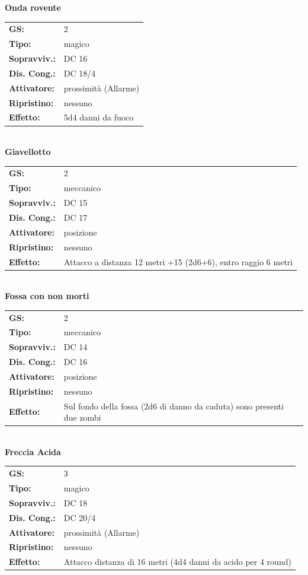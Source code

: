 \begin{multicols}{2}
\textbf{Onda rovente}

\begin{tabularx}{0.48\textwidth}{lX}
	\textbf{GS:} & 2 \\
	\textbf{Tipo:} & magico \\
	\textbf{Sopravviv.:} & DC 16 \\
	\textbf{Dis. Cong.:} & DC 18/4 \\
	\textbf{Attivatore:} & prossimità (Allarme) \\
	\textbf{Ripristino:} & nessuno \\
	\textbf{Effetto:} & 5d4 danni da fuoco
\end{tabularx}\\

\textbf{Giavellotto}

\begin{tabularx}{0.48\textwidth}{lX}
	\textbf{GS:} & 2 \\
	\textbf{Tipo:} & meccanico \\
	\textbf{Sopravviv.:} & DC 15 \\
	\textbf{Dis. Cong.:} & DC 17 \\
	\textbf{Attivatore:} & posizione \\
	\textbf{Ripristino:} & nessuno \\
	\textbf{Effetto:} & Attacco a distanza 12 metri +15 (2d6+6), entro raggio 6 metri
\end{tabularx}\\

\textbf{Fossa con non morti}

\begin{tabularx}{0.48\textwidth}{lX}
	\textbf{GS:} & 2 \\
	\textbf{Tipo:} & meccanico \\
	\textbf{Sopravviv.:} & DC 14 \\
	\textbf{Dis. Cong.:} & DC 16 \\
	\textbf{Attivatore:} & posizione \\
	\textbf{Ripristino:} & nessuno \\
	\textbf{Effetto:} & Sul fondo della fossa (2d6 di danno da caduta) sono presenti due zombi
\end{tabularx}\\

\textbf{Freccia Acida}

\begin{tabularx}{0.48\textwidth}{lX}
	\textbf{GS:} & 3 \\
	\textbf{Tipo:} & magico \\
	\textbf{Sopravviv.:} & DC 18 \\
	\textbf{Dis. Cong.:} & DC 20/4 \\
	\textbf{Attivatore:} & prossimità (Allarme) \\
	\textbf{Ripristino:} & nessuno \\
	\textbf{Effetto:} & Attacco distanza di 16 metri (4d4 danni da acido per 4 round)
\end{tabularx}\\


\end{multicols}
